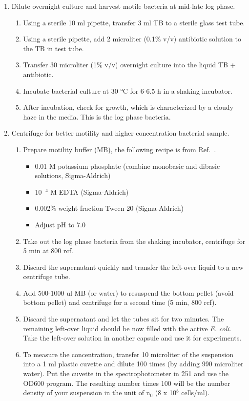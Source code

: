 \begin{enumerate}
  \item Dilute overnight culture and harvest motile bacteria at mid-late log phase.
  \begin{enumerate}
    \item Using a sterile 10 ml pipette, transfer 3 ml TB to a sterile glass test tube.
    \item Using a sterile pipette, add 2 microliter (0.1\% v/v) antibiotic solution to the TB in test tube.
    \item Transfer 30 microliter (1\% v/v) overnight culture into the liquid TB + antibiotic.
    \item Incubate bacterial culture at 30 °C for 6-6.5 h in a shaking incubator.
    \item After incubation, check for growth, which is characterized by a cloudy haze in the media. This is the log phase bacteria.
  \end{enumerate}
  \item Centrifuge for better motility and higher concentration bacterial sample.
  \begin{enumerate}
    \item Prepare motility buffer (MB), the following recipe is from Ref.~\cite{Peng2016}.
    \begin{itemize}
      \item 0.01 M potassium phosphate (combine monobasic and dibasic solutions, Sigma-Aldrich)
      \item 10$^{-4}$ M EDTA (Sigma-Aldrich)
      \item 0.002\% weight fraction Tween 20 (Sigma-Aldrich)
      \item Adjust pH to 7.0
    \end{itemize}
    \item Take out the log phase bacteria from the shaking incubator, centrifuge for 5 min at 800 rcf.
    \item Discard the supernatant quickly and transfer the left-over liquid to a new centrifuge tube.
    \item Add 500-1000 ul MB (or water) to resuspend the bottom pellet (avoid bottom pellet) and centrifuge for a second time (5 min, 800 rcf).
    \item Discard the supernatant and let the tubes sit for two minutes. The remaining left-over liquid should be now filled with the active \textit{E. coli}. Take the left-over solution in another capsule and use it for experiments.
    \item To measure the concentration, transfer 10 microliter of the suspension into a 1 ml plastic cuvette and dilute 100 times (by adding 990 microliter water). Put the cuvette in the spectrophotometer in 251 and use the OD600 program. The resulting number times 100 will be the number density of your suspension in the unit of n$_0$ (8 x 10$^8$ cells/ml).
  \end{enumerate}
\end{enumerate}

